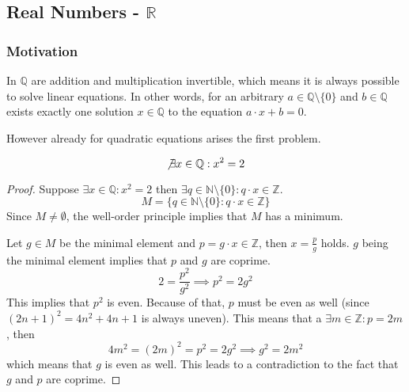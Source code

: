 \subsection{Real Numbers - \texorpdfstring{\(\mathbb{R}\)}{R}}
\subsubsection{Motivation}
In \(\mathbb{Q}\) are addition and multiplication invertible, which means it is always possible to solve linear equations.
In other words, for an arbitrary \(a \in \mathbb{Q} \setminus \{0\}\) and \(b \in \mathbb{Q}\) exists exactly one solution \(x \in \mathbb{Q}\) to the equation \(a \cdot x + b = 0\).

However already for quadratic equations arises the first problem.

\begin{theorem}
   \[\not\exists x \in \mathbb{Q}: x^2 = 2\]
\end{theorem}
\begin{proof}
   Suppose \(\exists x \in \mathbb{Q}: x^2 = 2\) then \(\exists q \in \mathbb{N} \setminus \{0\}: q \cdot x \in \mathbb{Z}\).
   \[M = \{q \in \mathbb{N}\setminus\{0\}: q \cdot x \in \mathbb{Z}\}\]
   Since \(M \neq \emptyset\), the well-order principle implies that \(M\) has a minimum.

   Let \(g \in M\) be the minimal element and \(p = g \cdot x \in \mathbb{Z}\), then \(x = \frac{p}{g}\) holds.
   \(g\) being the minimal element implies that \(p\) and \(g\) are coprime.
   \[2 = \frac{p^2}{g^2} \implies p^2 = 2 g^2\]
   This implies that \(p^2\) is even.
   Because of that, \(p\) must be even as well (since \((2n + 1)^2 = 4n^2 + 4n + 1\) is always uneven).
   This means that a \(\exists m \in \mathbb{Z}: p = 2m\), then
   \[4m^2 = (2m)^2 = p^2 = 2g^2 \implies g^2 = 2m^2\]
   which means that \(g\) is even as well.
   This leads to a contradiction to the fact that \(g\) and \(p\) are coprime.
\end{proof}

